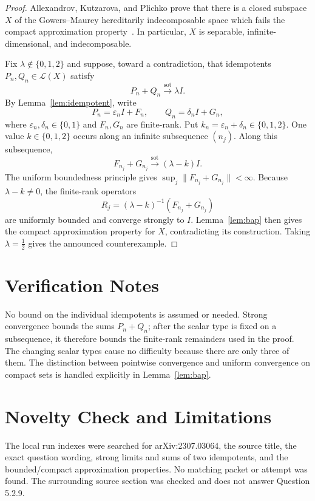\documentclass[11pt]{article}
\newcommand{\Lop}{\mathcal L}
\newcommand{\I}{I}
\begin{document}
\begin{proof}
Allexandrov, Kutzarova, and Plichko prove that there is a closed subspace $X$
of the Gowers--Maurey hereditarily indecomposable space which fails the compact
approximation property~\cite{AKP}.  In particular, $X$ is separable,
infinite-dimensional, and indecomposable.

Fix $\lambda\notin\{0,1,2\}$ and suppose, toward a contradiction, that
idempotents $P_n,Q_n\in\Lop(X)$ satisfy
\[
P_n+Q_n\xrightarrow{\mathrm{sot}}\lambda\I.
\]
By Lemma~\ref{lem:idempotent}, write
\[
P_n=\varepsilon_n\I+F_n,\qquad
Q_n=\delta_n\I+G_n,
\]
where $\varepsilon_n,\delta_n\in\{0,1\}$ and $F_n,G_n$ are finite-rank.
Put $k_n=\varepsilon_n+\delta_n\in\{0,1,2\}$.  One value
$k\in\{0,1,2\}$ occurs along an infinite subsequence $(n_j)$.  Along this
subsequence,
\[
F_{n_j}+G_{n_j}\xrightarrow{\mathrm{sot}}(\lambda-k)\I.
\]
The uniform boundedness principle gives
$\sup_j\|F_{n_j}+G_{n_j}\|<\infty$.  Because $\lambda-k\ne0$, the
finite-rank operators
\[
R_j=(\lambda-k)^{-1}(F_{n_j}+G_{n_j})
\]
are uniformly bounded and converge strongly to $\I$.  Lemma~\ref{lem:bap}
then gives the compact approximation property for $X$, contradicting its
construction.  Taking $\lambda=\tfrac12$ gives the announced counterexample.
\end{proof}

\section*{Verification Notes}

No bound on the individual idempotents is assumed or needed.  Strong
convergence bounds the sums $P_n+Q_n$; after the scalar type is fixed on a
subsequence, it therefore bounds the finite-rank remainders used in the proof.
The changing scalar types cause no difficulty because there are only three of
them.  The distinction between pointwise convergence and uniform convergence
on compact sets is handled explicitly in Lemma~\ref{lem:bap}.

\section*{Novelty Check and Limitations}

The local run indexes were searched for arXiv:2307.03064, the source title,
the exact question wording, strong limits and sums of two idempotents, and the
bounded/compact approximation properties.  No matching packet or attempt was
found.  The surrounding source section was checked and does not answer
Question 5.2.9.
\end{document}
